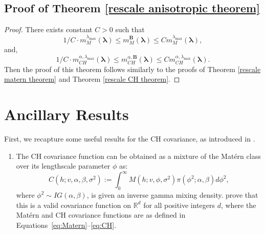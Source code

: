 \documentclass[ejs,noshowframe]{imsart}
\theoremstyle{plain}
\theoremstyle{definition}
\theoremstyle{remark}
\begin{document}
\begin{appendix}
\subsection{Proof of Theorem \ref{rescale anisotropic theorem}}
\begin{proof}
There exists constant $C>0$  such that 
 $$ 1/C \cdot m_M^{{\lambda_{\max}}}(\bm{\lambda})  \leq m_M^{\bm{B}}(\bm{\lambda}) \leq C m_M^{{\lambda_{\max}}}(\bm{\lambda}), $$
 and,
 $$
 1/C \cdot m^{\alpha,\lambda_{\max}}_{CH}(\bm{\lambda})  \leq m^{\alpha,\bm{B}}_{CH}(\bm{\lambda}) \leq C m^{\alpha,\lambda_{\max}}_{CH}(\bm{\lambda}).
 $$
Then the proof of this theorem follows similarly to the proofs of  Theorem \ref{rescale matern theorem} and Theorem \ref{rescale CH theorem}.
\end{proof}


\section{Ancillary Results} \label{Ancillary}
First,  we recapture some useful results for the CH covariance, as introduced in \cite{ma2022beyond}.

\begin{enumerate}

\item The CH covariance function can be  obtained as a mixture of the Mat\'ern class over its lengthscale parameter $\phi$ as: 
$$C(h;v,\alpha,\beta,\sigma^2) := \int_0^{\infty} M(h;v,\phi,\sigma^2) \pi(\phi^2;\alpha,\beta) d \phi^2,$$
where $\phi^2 \sim IG(\alpha,\beta)$,
is given an inverse gamma mixing density. \cite{ma2022beyond} prove that this is a valid covariance function on $\mathbb{R}^d$ for all positive integers $d$, where the Mat\'ern and CH covariance functions are as defined in Equations~\eqref{eq:Matern}--\eqref{eq:CH}.


\end{enumerate}
\end{appendix}
\end{document}
